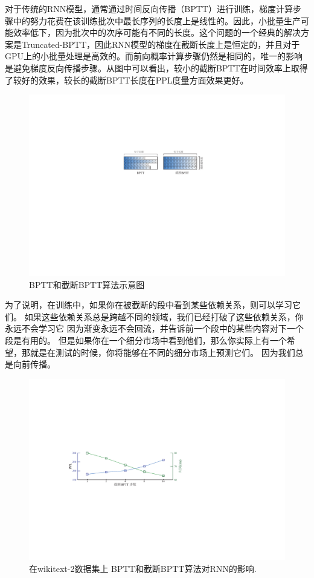 对于传统的RNN模型，通常通过时间反向传播（BPTT）进行训练，梯度计算步骤中的努力花费在该训练批次中最长序列的长度上是线性的。因此，小批量生产可能效率低下，因为批次中的次序可能有不同的长度。这个问题的一个经典的解决方案是Truncated-BPTT，因此RNN模型的梯度在截断长度上是恒定的，并且对于GPU上的小批量处理是高效的。而前向概率计算步骤仍然是相同的，唯一的影响是避免梯度反向传播步骤。从图中可以看出，较小的截断BPTT在时间效率上取得了较好的效果，较长的截断BPTT长度在PPL度量方面效果更好。
\begin{figure}[!h]
  \centering
  \includegraphics[width=0.7\columnwidth]{./figures/minibatch.pdf}
  \caption{BPTT和截断BPTT算法示意图}\label{fig:minibatch}
\end{figure}

为了说明，在训练中，如果你在被截断的段中看到某些依赖关系，则可以学习它们。 如果这些依赖关系总是跨越不同的领域，我们已经打破了这些依赖关系，你永远不会学习它 因为渐变永远不会回流，并告诉前一个段中的某些内容对下一个段是有用的。 但是如果你在一个细分市场中看到他们，那么你实际上有一个希望，那就是在测试的时候，你将能够在不同的细分市场上预测它们。 因为我们总是向前传播。
\begin{figure}[!h]
  \centering
  \includegraphics[width=0.9\columnwidth]{./figures/tbptt.pdf}
  \caption{在wikitext-2数据集上 BPTT和截断BPTT算法对RNN的影响.}\label{fig:tbptt}
\end{figure}

